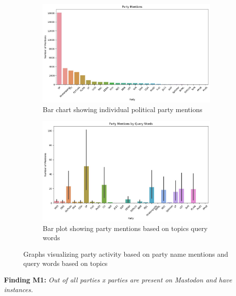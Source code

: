 \begin{figure}[!]
  \centering
  \begin{subfigure}[h]{.49\linewidth}
    \includegraphics[width=\textwidth]{media/party-mentions.jpeg}
    \captionsetup{justification=centering}
    \caption{Bar chart showing individual political party mentions}
    \label{fig:partymentions}
  \end{subfigure}
  \begin{subfigure}[h]{.49\linewidth}
      \captionsetup{justification=centering}
      \includegraphics[width=\textwidth]{media/party-mentions-query-words.jpeg}
      \caption{Bar plot showing party mentions based on topics query words}
      \label{fig:partymentionsquery}
  \end{subfigure}
  \caption{Graphs visualizing party activity based on party name mentions and query words based on topics}
  \label{fig:results}
\end{figure}

\textbf{Finding M1:} \textit{Out of all parties x parties are present on Mastodon and have instances.}

